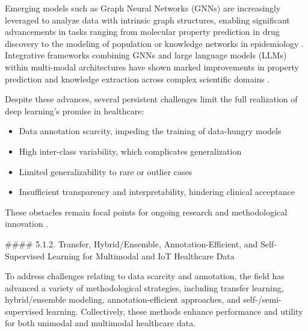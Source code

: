 \documentclass[11pt]{article}
\begin{document}
Emerging models such as Graph Neural Networks (GNNs) are increasingly leveraged to analyze data with intrinsic graph structures, enabling significant advancements in tasks ranging from molecular property prediction in drug discovery to the modeling of population or knowledge networks in epidemiology \cite{ref33,ref35,ref57}. Integrative frameworks combining GNNs and large language models (LLMs) within multi-modal architectures have shown marked improvements in property prediction and knowledge extraction across complex scientific domains \cite{ref33}.

Despite these advances, several persistent challenges limit the full realization of deep learning’s promise in healthcare:
\begin{itemize}
    \item Data annotation scarcity, impeding the training of data-hungry models
    \item High inter-class variability, which complicates generalization
    \item Limited generalizability to rare or outlier cases
    \item Insufficient transparency and interpretability, hindering clinical acceptance
\end{itemize}
These obstacles remain focal points for ongoing research and methodological innovation \cite{ref30,ref41,ref49,ref53,ref54,ref56,ref65,ref71}.

#### 5.1.2. Transfer, Hybrid/Ensemble, Annotation-Efficient, and Self-Supervised Learning for Multimodal and IoT Healthcare Data

To address challenges relating to data scarcity and annotation, the field has advanced a variety of methodological strategies, including transfer learning, hybrid/ensemble modeling, annotation-efficient approaches, and self-/semi-supervised learning. Collectively, these methods enhance performance and utility for both unimodal and multimodal healthcare data.
\end{document}
